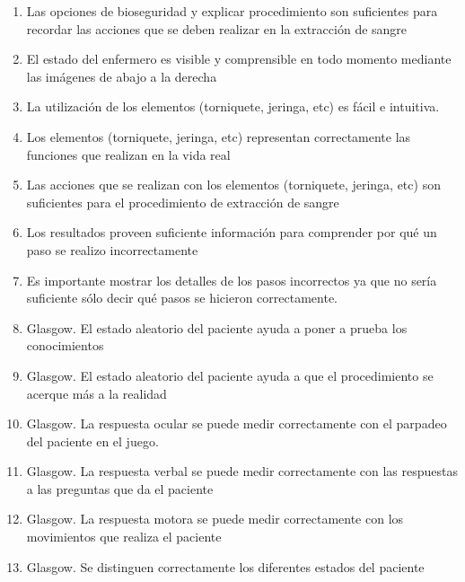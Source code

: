 \begin{enumerate}[label=\bfseries SC\arabic*.:]
\item Las opciones de bioseguridad y explicar procedimiento son suficientes para
recordar las acciones que se deben realizar en la extracción de sangre

\item El estado del enfermero es visible y comprensible en todo momento mediante las
imágenes de abajo a la derecha


\item La utilización de los elementos (torniquete, jeringa, etc) es fácil e intuitiva.


\item Los elementos (torniquete, jeringa, etc) representan correctamente las funciones
que realizan en la vida real

\item Las acciones que se realizan con los elementos (torniquete, jeringa, etc) son
suficientes para el procedimiento de extracción de sangre

\item Los resultados proveen suficiente información para comprender por qué un paso
se realizo incorrectamente


\item Es importante mostrar los detalles de los pasos incorrectos ya que no sería
suficiente sólo decir qué pasos se hicieron correctamente.

\item Glasgow. El estado aleatorio del paciente ayuda a poner a prueba los
conocimientos

\item Glasgow. El estado aleatorio del paciente ayuda a que el procedimiento se
acerque más a la realidad

\item Glasgow. La respuesta ocular se puede medir correctamente con el parpadeo
del paciente en el juego.

\item Glasgow. La respuesta verbal se puede medir correctamente con las respuestas
a las preguntas que da el paciente

\item Glasgow. La respuesta motora se puede medir correctamente con los
movimientos que realiza el paciente

\item Glasgow. Se distinguen correctamente los diferentes estados del paciente


\end{enumerate}
